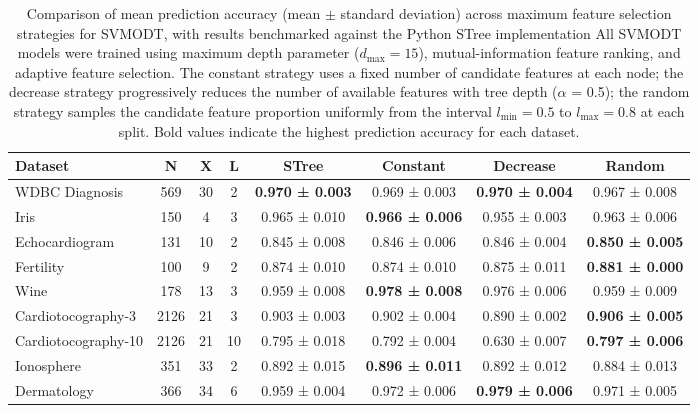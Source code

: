 \begin{table}
\centering
\caption{\label{tab:svmodt-max-features-accuracy-score-table-latex}Comparison of mean prediction accuracy (mean \(\pm\) standard deviation) across maximum feature selection strategies for SVMODT, with results benchmarked against the Python STree implementation All SVMODT models were trained using maximum depth parameter (\(d_{\max}=15\)), mutual-information feature ranking, and adaptive feature selection. The constant strategy uses a fixed number of candidate features at each node; the decrease strategy progressively reduces the number of available features with tree depth (\(\alpha\) = 0.5); the random strategy samples the candidate feature proportion uniformly from the interval \(l_{\min}=0.5\) to \(l_{\max}=0.8\) at each split. Bold values indicate the highest prediction accuracy for each dataset.}
\centering
\fontsize{8}{10}\selectfont
\begin{tabular}[t]{l|c|c|c|c|c|c|c}
\hline
Dataset & N & X & L & STree & Constant & Decrease & Random\\
\hline
WDBC Diagnosis & 569 & 30 & 2 & \textbf{0.970 ± 0.003} & 0.969 ± 0.003 & \textbf{0.970 ± 0.004} & 0.967 ± 0.008\\
\hline
Iris & 150 & 4 & 3 & 0.965 ± 0.010 & \textbf{0.966 ± 0.006} & 0.955 ± 0.003 & 0.963 ± 0.006\\
\hline
Echocardiogram & 131 & 10 & 2 & 0.845 ± 0.008 & 0.846 ± 0.006 & 0.846 ± 0.004 & \textbf{0.850 ± 0.005}\\
\hline
Fertility & 100 & 9 & 2 & 0.874 ± 0.010 & 0.874 ± 0.010 & 0.875 ± 0.011 & \textbf{0.881 ± 0.000}\\
\hline
Wine & 178 & 13 & 3 & 0.959 ± 0.008 & \textbf{0.978 ± 0.008} & 0.976 ± 0.006 & 0.959 ± 0.009\\
\hline
Cardiotocography-3 & 2126 & 21 & 3 & 0.903 ± 0.003 & 0.902 ± 0.004 & 0.890 ± 0.002 & \textbf{0.906 ± 0.005}\\
\hline
Cardiotocography-10 & 2126 & 21 & 10 & 0.795 ± 0.018 & 0.792 ± 0.004 & 0.630 ± 0.007 & \textbf{0.797 ± 0.006}\\
\hline
Ionosphere & 351 & 33 & 2 & 0.892 ± 0.015 & \textbf{0.896 ± 0.011} & 0.892 ± 0.012 & 0.884 ± 0.013\\
\hline
Dermatology & 366 & 34 & 6 & 0.959 ± 0.004 & 0.972 ± 0.006 & \textbf{0.979 ± 0.006} & 0.971 ± 0.005\\
\hline
\end{tabular}
\end{table}

